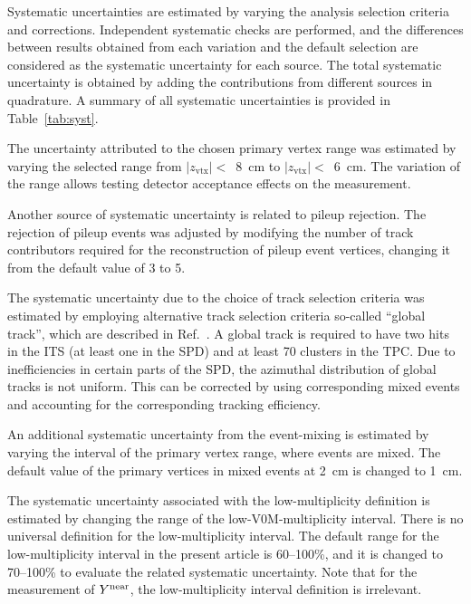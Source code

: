 Systematic uncertainties are estimated by varying the analysis selection criteria and corrections. Independent systematic checks are performed, and the differences between results obtained from each variation and the default selection are considered as the systematic uncertainty for each source. The total systematic uncertainty is obtained by adding the contributions from different sources in quadrature. A summary of all systematic uncertainties is provided in Table~\ref{tab:syst}. 

The uncertainty attributed to the chosen primary vertex range was estimated by varying the selected range from $|z_\mathrm{vtx}|<$~8~cm to $|z_\mathrm{vtx}|<$~6~cm. The variation of the range allows testing detector acceptance effects on the measurement.  

Another source of systematic uncertainty is related to pileup rejection. The rejection of pileup events was adjusted by modifying the number of track contributors required for the reconstruction of pileup event vertices, changing it from the default value of 3 to 5.

The systematic uncertainty due to the choice of track selection criteria was estimated by employing alternative track selection criteria so-called “global track”, which are described in Ref.~\cite{ALICE:2021ptz}. A global track is required to have two hits in the ITS (at least one in the SPD) and at least 70 clusters in the TPC. Due to inefficiencies in certain parts of the SPD, the azimuthal distribution of global tracks is not uniform. This can be corrected by using corresponding mixed events and accounting for the corresponding tracking efficiency.


An additional systematic uncertainty from the event-mixing is estimated by varying the interval of the primary vertex range, where events are mixed. The default value of the primary vertices in mixed events at 2~cm is changed to 1~cm. 

The systematic uncertainty associated with the low-multiplicity definition is estimated by changing the range of the low-V0M-multiplicity interval. There is no universal definition for the low-multiplicity interval. The default range for the low-multiplicity interval in the present article is 60--100\%, and it is changed to 70--100\% to evaluate the related systematic uncertainty. 
Note that for the measurement of $Y^{\rm{near}}$, the low-multiplicity interval definition is irrelevant. 

